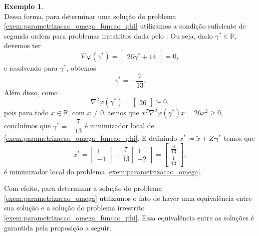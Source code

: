 \documentclass[12pt,a4paper]{scrartcl}
\def\RR{\mathds{R}}
\theoremstyle{definition}%
\newtheorem{exem}{Exemplo}
\begin{document}
\begin{exem}
\[\]
Dessa forma, para determinar uma solução do problema \eqref{exem:parametrizacao_omega_funcao_phi} utilizamos a condição suficiente de segunda ordem para problemas irrestritos dada pelo . Ou seja, dado $\gamma^{*} \in \RR$, devemos ter
\[
\nabla \varphi(\gamma^{*}) = \begin{bmatrix*} 26 \gamma^{*} +14 \end{bmatrix*} = 0 ,
\]
e resolvendo para $\gamma^{*}$, obtemos
\[
\gamma^{*} = - \dfrac{7}{13} .
\]
Além disso, como
\[
\nabla^{2} \varphi(\gamma^{*}) = \begin{bmatrix*} 26 \end{bmatrix*} \succ 0 ,
\]
pois para todo $x\in \RR$, com $x\neq 0$, temos que $x^{T}\nabla^{2} \varphi(\gamma^{*})x = 26x^{2} \geq 0$, concluímos que $\gamma^{*} =  -\dfrac{7}{13}$ é minimizador local de \eqref{exem:parametrizacao_omega_funcao_phi}. E definindo $x^{*} \coloneqq  \tilde{x} + Z\boldsymbol{\gamma}^{*}$ temos que 
\[
x^{*} = \begin{bmatrix*} 1 \\ -1 \end{bmatrix*}  -\dfrac{7}{13}\begin{bmatrix*} 1 \\ -2 \end{bmatrix*}  = \begin{bmatrix*} \frac{6}{13} \\ \frac{1}{13} \end{bmatrix*} ,
\]
é minimizador local do problema \eqref{exem:parametrizacao_omega}.
\end{exem}

Com efeito, para determinar a solução do problema \eqref{exem:parametrizacao_omega} utilizamos o fato de haver uma equivalência entre sua solução e a solução do problema irrestrito \eqref{exem:parametrizacao_omega_funcao_phi}. Essa equivalência entre as soluções é garantida pela proposição a seguir.
\end{document}

